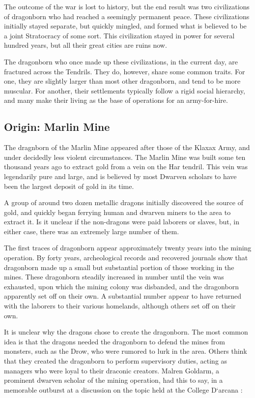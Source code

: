 \begin{multicols}{2}
The outcome of the war is lost to history, but the end result was two civilizations of dragonborn who had reached a seemingly permanent peace.
These civilizations initially stayed separate, but quickly mingled, and formed what is believed to be a joint Stratocracy of some sort.
This civilization stayed in power for several hundred years, but all their great cities are ruins now.

The dragonborn who once made up these civilizations, in the current day, are fractured across the Tendrils.
They do, however, share some common traits.
For one, they are slightly larger than most other dragonborn, and tend to be more muscular.
For another, their settlements typically follow a rigid social hierarchy, and many make their living as the base of operations for an army-for-hire.

\subsection{Origin: Marlin Mine}
The dragnborn of the Marlin Mine appeared after those of the Klaxax Army, and under decidedly less violent circumstances.
The Marlin Mine was built some ten thousand years ago to extract gold from a vein on the Har tendril.
This vein was legendarily pure and large, and is believed by most Dwarven scholars to have been the largest deposit of gold in its time.

A group of around two dozen metallic dragons initially discovered the source of gold, and quickly began ferrying human and dwarven miners to the area to extract it.
Is it unclear if the non-dragons were paid laborers or slaves, but, in either case, there was an extremely large number of them.

The first traces of dragonborn appear approximately twenty years into the mining operation.
By forty years, archeological records and recovered journals show that dragonborn made up a small but substantial portion of those working in the mines.
These dragonborn steadily increased in number until the vein was exhausted, upon which the mining colony was disbanded, and the dragonborn apparently set off on their own.
A substantial number appear to have returned with the laborers to their various homelands, although others set off on their own.

It is unclear why the dragons chose to create the dragonborn.
The most common idea is that the dragons needed the dragonborn to defend the mines from monsters, such as the Drow, who were rumored to lurk in the area.
Others think that they created the dragonborn to perform supervisory duties, acting as managers who were loyal to their draconic creators.
Malren Goldarm, a prominent dwarven scholar of the mining operation, had this to say, in a memorable outburst at a discussion on the topic held at the College D`arcana :


\end{multicols}

